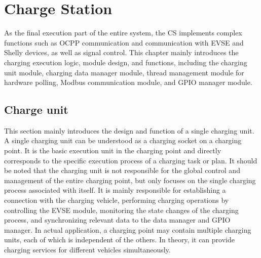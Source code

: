 \documentclass[
	english,
	ruledheaders=section,%
	class=report,%
	thesis={type=Report},%
	accentcolor=9c,%
	custommargins=true,%
	marginpar=false,%
	parskip=half-,%
	fontsize=11pt,%
	logofile={img/tuda_logo.pdf}, %
]{tudapub}
\begin{document}
\chapter{Charge Station}


As the final execution part of the entire system, the \ac{CS} implements complex functions such as \ac{OCPP} communication and communication with EVSE and Shelly devices, as well as signal control. This chapter mainly introduces the charging execution logic, module design, and functions, including the charging unit module, charging data manager module, thread management module for hardware polling, Modbus communication module, and GPIO manager module.










\section{Charge unit}
\label{sec:chargeUnit}

This section mainly introduces the design and function of a single charging unit. A single charging unit can be understood as a charging socket on a charging point. It is the basic execution unit in the charging point and directly corresponds to the specific execution process of a charging task or plan. It should be noted that the charging unit is not responsible for the global control and management of the entire charging point, but only focuses on the single charging process associated with itself. It is mainly responsible for establishing a connection with the charging vehicle, performing charging operations by controlling the EVSE module, monitoring the state changes of the charging process, and synchronizing relevant data to the data manager and GPIO manager. In actual application, a charging point may contain multiple charging units, each of which is independent of the others. In theory, it can provide charging services for different vehicles simultaneously.
\end{document}
